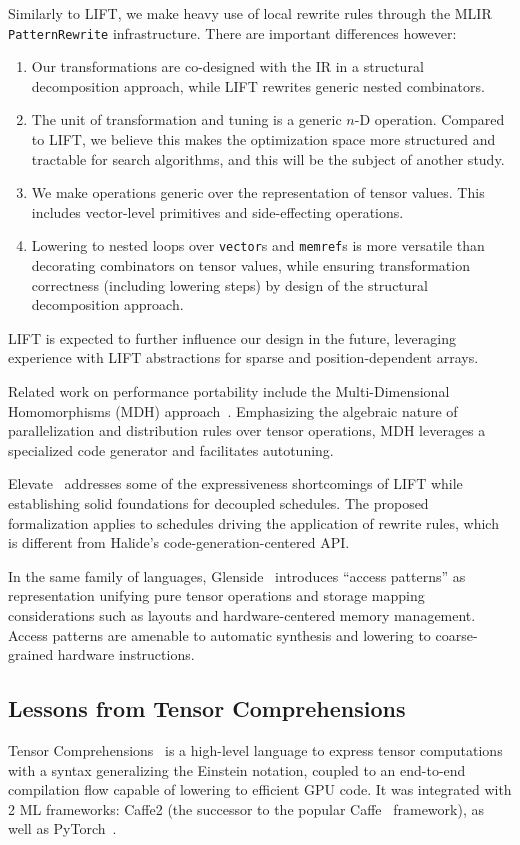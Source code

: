Similarly to LIFT, we make heavy use of local rewrite rules through the MLIR \lstinline|PatternRewrite| infrastructure.
There are important differences however:
\begin{enumerate}
    \item Our transformations are co-designed with the IR in a structural decomposition approach, while LIFT rewrites generic nested combinators.
    \item The unit of transformation and tuning is a generic $n$-D operation. Compared to LIFT, we believe this makes the optimization space more structured and tractable for search algorithms, and this will be the subject of another study.
    \item We make operations generic over the representation of tensor values. This includes vector-level primitives and side-effecting operations.
    \item Lowering to nested loops over \lstinline{vector}s and \lstinline{memref}s is more versatile than decorating combinators on tensor values, while ensuring transformation correctness (including lowering steps) by design of the structural decomposition approach.
\end{enumerate}

LIFT is expected to further influence our design in the future, leveraging experience with LIFT abstractions for sparse and position-dependent arrays.

Related work on performance portability include the Multi-Dimensional Homomorphisms (MDH) approach~\cite{Rasch2019GeneratingPH}. Emphasizing the algebraic nature of parallelization and distribution rules over tensor operations, MDH leverages a specialized code generator and facilitates autotuning.

Elevate~\cite{Elevate} addresses some of the expressiveness shortcomings of LIFT while establishing solid foundations for decoupled schedules. The proposed formalization applies to schedules driving the application of rewrite rules, which is different from Halide's code-generation-centered API.

In the same family of languages, Glenside~\cite{Glenside} introduces ``access patterns'' as representation unifying pure tensor operations and storage mapping considerations such as layouts and hardware-centered memory management. Access patterns are amenable to automatic synthesis and lowering to coarse-grained hardware instructions.

\subsection{Lessons from Tensor Comprehensions}
Tensor Comprehensions~\cite{vasilache2019next} is a high-level language to express tensor computations with a syntax generalizing the Einstein notation, coupled to an end-to-end compilation flow capable of lowering to efficient GPU code. It was integrated with 2 ML frameworks: Caffe2 (the successor to the popular Caffe~\cite{Caffe} framework), as well as 
PyTorch~\cite{PyTorch}.

